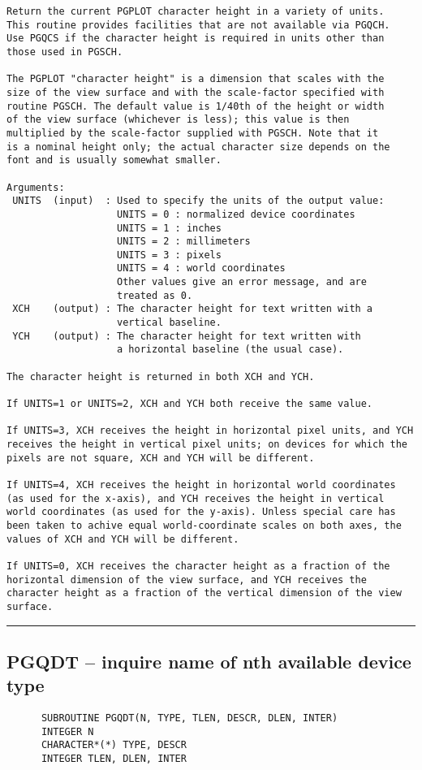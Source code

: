 {\begin{verbatim}
Return the current PGPLOT character height in a variety of units.
This routine provides facilities that are not available via PGQCH.
Use PGQCS if the character height is required in units other than
those used in PGSCH.

The PGPLOT "character height" is a dimension that scales with the
size of the view surface and with the scale-factor specified with
routine PGSCH. The default value is 1/40th of the height or width
of the view surface (whichever is less); this value is then
multiplied by the scale-factor supplied with PGSCH. Note that it
is a nominal height only; the actual character size depends on the
font and is usually somewhat smaller.

Arguments:
 UNITS  (input)  : Used to specify the units of the output value:
                   UNITS = 0 : normalized device coordinates
                   UNITS = 1 : inches
                   UNITS = 2 : millimeters
                   UNITS = 3 : pixels
                   UNITS = 4 : world coordinates
                   Other values give an error message, and are
                   treated as 0.
 XCH    (output) : The character height for text written with a
                   vertical baseline.
 YCH    (output) : The character height for text written with
                   a horizontal baseline (the usual case).

The character height is returned in both XCH and YCH.

If UNITS=1 or UNITS=2, XCH and YCH both receive the same value.

If UNITS=3, XCH receives the height in horizontal pixel units, and YCH
receives the height in vertical pixel units; on devices for which the
pixels are not square, XCH and YCH will be different.

If UNITS=4, XCH receives the height in horizontal world coordinates
(as used for the x-axis), and YCH receives the height in vertical
world coordinates (as used for the y-axis). Unless special care has
been taken to achive equal world-coordinate scales on both axes, the
values of XCH and YCH will be different.

If UNITS=0, XCH receives the character height as a fraction of the
horizontal dimension of the view surface, and YCH receives the
character height as a fraction of the vertical dimension of the view
surface.
\end{verbatim}
\hrule


\subsection*{PGQDT -- inquire name of nth available device type }
\begin{verbatim}
      SUBROUTINE PGQDT(N, TYPE, TLEN, DESCR, DLEN, INTER)
      INTEGER N
      CHARACTER*(*) TYPE, DESCR
      INTEGER TLEN, DLEN, INTER


\end{verbatim}}
